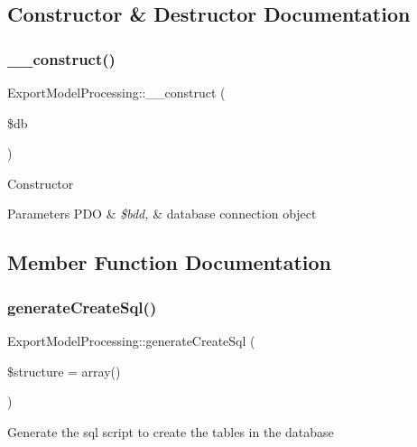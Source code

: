 \subsection{Constructor \& Destructor Documentation}
\mbox{\label{classExportModelProcessing_a5f3544bdd5de2c528d301db24751a90a}} 
\subsubsection{\texorpdfstring{\+\_\+\+\_\+construct()}{\_\_construct()}}
{\footnotesize\ttfamily Export\+Model\+Processing\+::\+\_\+\+\_\+construct (\begin{DoxyParamCaption}\item[{P\+DO}]{\$db }\end{DoxyParamCaption})}

Constructor


\begin{DoxyParams}[1]{Parameters}
P\+DO & {\em \$bdd,} & database connection object \\
\hline
\end{DoxyParams}


\subsection{Member Function Documentation}
\mbox{\label{classExportModelProcessing_a55bf879da8bb3b010e36939195ff7756}} 
\subsubsection{\texorpdfstring{generate\+Create\+Sql()}{generateCreateSql()}}
{\footnotesize\ttfamily Export\+Model\+Processing\+::generate\+Create\+Sql (\begin{DoxyParamCaption}\item[{array}]{\$structure = {\ttfamily array()} }\end{DoxyParamCaption})}

Generate the sql script to create the tables in the database


